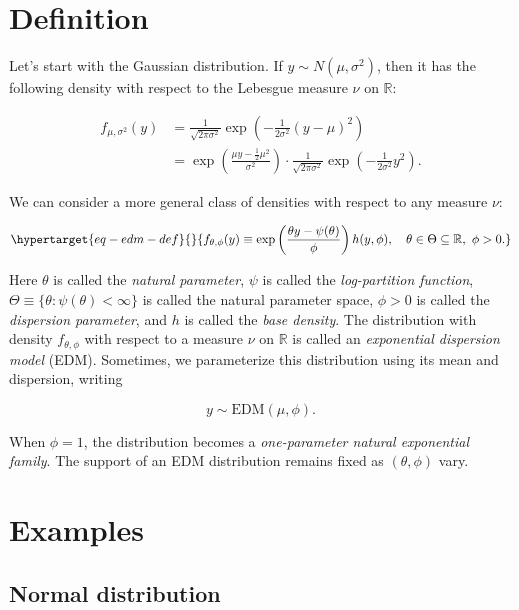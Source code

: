 \documentclass[
  11pt,
  letterpaper,
  oneside]{book}
\theoremstyle{plain}
\theoremstyle{plain}
\theoremstyle{definition}
\theoremstyle{definition}
\theoremstyle{plain}
\theoremstyle{remark}
\begin{document}
\hypertarget{definition}{%
\section{Definition}\label{definition}}

Let's start with the Gaussian distribution. If
\(y \sim N(\mu, \sigma^2)\), then it has the following density with
respect to the Lebesgue measure \(\nu\) on \(\mathbb{R}\):

\[
\begin{split}
f_{\mu, \sigma^2}(y) &= \frac{1}{\sqrt{2\pi \sigma^2}}\exp\left(-\frac{1}{2\sigma^2}(y-\mu)^2\right) \\
&= \exp\left(\frac{\mu y - \frac{1}{2}\mu^2}{\sigma^2}\right) \cdot \frac{1}{\sqrt{2\pi \sigma^2}}\exp\left(-\frac1{2\sigma^2} y^2\right).
\end{split}
\]

We can consider a more general class of densities with respect to any
measure \(\nu\):

\begin{equation}\protect\hypertarget{eq-edm-def}{}{
f_{\theta, \phi}(y) \equiv \exp\left(\frac{\theta y - \psi(\theta)}{\phi}\right)h(y, \phi), \quad \theta \in \Theta \subseteq \mathbb{R}, \ \phi > 0.
}\label{eq-edm-def}\end{equation}

Here \(\theta\) is called the \emph{natural parameter}, \(\psi\) is
called the \emph{log-partition function},
\(\Theta \equiv \{\theta: \psi(\theta) < \infty\}\) is called the
natural parameter space, \(\phi > 0\) is called the \emph{dispersion
parameter}, and \(h\) is called the \emph{base density}. The
distribution with density \(f_{\theta, \phi}\) with respect to a measure
\(\nu\) on \(\mathbb{R}\) is called an \emph{exponential dispersion
model} (EDM). Sometimes, we parameterize this distribution using its
mean and dispersion, writing

\[
y \sim \text{EDM}(\mu, \phi).
\]

When \(\phi = 1\), the distribution becomes a \emph{one-parameter
natural exponential family}. The support of an EDM distribution remains
fixed as \((\theta, \phi)\) vary.

\hypertarget{examples}{%
\section{Examples}\label{examples}}

\hypertarget{normal-distribution}{%
\subsection{Normal distribution}\label{normal-distribution}}
\end{document}

